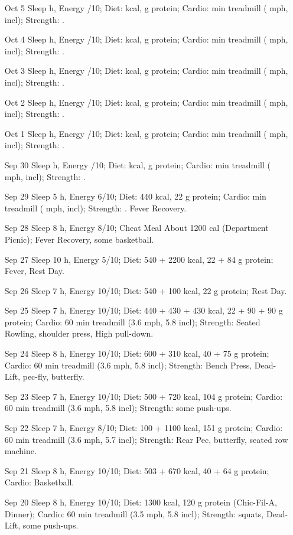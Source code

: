 \documentclass{article}
\begin{document}
\begin{itemize}
\item [Oct 5] Sleep h, Energy /10; Diet: kcal, g protein; Cardio:  min treadmill ( mph, incl); Strength: .
\item [Oct 4] Sleep h, Energy /10; Diet: kcal, g protein; Cardio:  min treadmill ( mph, incl); Strength: .
\item [Oct 3] Sleep h, Energy /10; Diet: kcal, g protein; Cardio:  min treadmill ( mph, incl); Strength: .
\item [Oct 2] Sleep h, Energy /10; Diet: kcal, g protein; Cardio:  min treadmill ( mph, incl); Strength: .
\item [Oct 1] Sleep h, Energy /10; Diet: kcal, g protein; Cardio:  min treadmill ( mph, incl); Strength: .
\item [Sep 30] Sleep h, Energy /10; Diet: kcal, g protein; Cardio:  min treadmill ( mph, incl); Strength: .
\item [Sep 29] Sleep 5 h, Energy 6/10; Diet: 440 kcal, 22 g protein; Cardio:  min treadmill ( mph, incl); Strength: . Fever Recovery. 
\item [Sep 28] Sleep 8 h, Energy 8/10; Cheat Meal About 1200 cal (Department Picnic); Fever Recovery, some basketball.
\item [Sep 27] Sleep 10 h, Energy 5/10; Diet: 540 + 2200 kcal, 22 + 84 g protein; Fever, Rest Day.
\item [Sep 26] Sleep 7 h, Energy 10/10; Diet: 540 + 100 kcal, 22 g protein; Rest Day.
\item [Sep 25] Sleep 7 h, Energy 10/10; Diet: 440 + 430 + 430 kcal, 22 + 90 + 90 g protein; Cardio: 60 min treadmill (3.6 mph, 5.8 incl); Strength: Seated Rowling, shoulder press, High pull-down.
\item [Sep 24] Sleep 8 h, Energy 10/10; Diet:  600 + 310 kcal, 40 + 75 g protein; Cardio: 60 min treadmill (3.6 mph, 5.8 incl); Strength: Bench Press, Dead-Lift, pec-fly, butterfly.
\item [Sep 23] Sleep 7 h, Energy 10/10; Diet: 500 + 720 kcal, 104 g protein; Cardio: 60 min treadmill (3.6 mph,  5.8 incl); Strength: some push-ups.
\item [Sep 22] Sleep 7 h, Energy 8/10; Diet:  100 + 1100 kcal, 151 g protein; Cardio: 60 min treadmill (3.6 mph,  5.7 incl); Strength: Rear Pec, butterfly, seated row machine.
\item [Sep 21] Sleep 8 h, Energy 10/10; Diet:  503 + 670 kcal,  40 + 64 g protein; Cardio: Basketball.
\item [Sep 20] Sleep 8 h, Energy 10/10; Diet: 1300 kcal, 120 g protein (Chic-Fil-A, Dinner); Cardio: 60 min treadmill (3.5 mph, 5.8 incl); Strength: squats, Dead-Lift, some push-ups.

\end{itemize}
\end{document}
